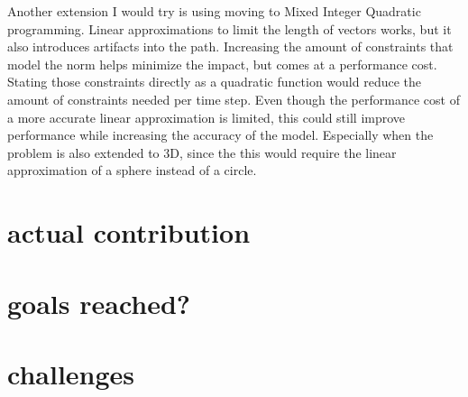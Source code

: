 Another extension I would try is using moving to Mixed Integer Quadratic programming. Linear approximations to limit the length of vectors works, but it also introduces artifacts into the path. Increasing the amount of constraints that model the norm helps minimize the impact, but comes at a performance cost. Stating those constraints directly as a quadratic function would reduce the amount of constraints needed per time step. Even though the performance cost of a more accurate linear approximation is limited, this could still improve performance while increasing the accuracy of the model. Especially when the problem is also extended to 3D, since the this would require the linear approximation of a sphere instead of a circle. \\

\section{actual contribution}
\section{goals reached?}


\section{challenges}